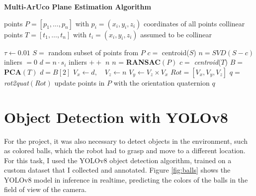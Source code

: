 \begin{algorithm}[H]
    \caption{\textbf{Multi-ArUco Plane Estimation Algorithm}}
    \label{alg:multi_aruco}
    \begin{algorithmic}[1]
    
    \Require points $P = \left[ p_1, \ldots, p_n \right]$ with $p_i = (x_i, y_i, z_i)$ coordinates of all points
    \Require collinear points $T = \left[t_1, \ldots, t_n \right]$ with $t_i = (x_i, y_i, z_i)$ assumed to be collinear
    
        \State $\tau \gets 0.01$ 
        \Repeat
            \State $S =$ random subset of points from $P$
            \State $c =$ centroid($S$) 
            \State $n = SVD(S - c)$  
            \State inliers $ = 0$ 
            \State $d = n \cdot s_i$ 
                 
                    \State inliers $++$
                \EndIf
            \EndFor
        \State \Return $n$ 
    \EndFunction
    \State
    \State $n$ = \textbf{RANSAC}$(P)$
    \State $c =$ \textit{centroid}($T$) 
    \State $B = $ \textbf{PCA}$(T)$ 
    \State $d = B[2]$ 
    \State $V_x \gets d, \quad V_z \gets n$
    \State $V_y \gets V_z \times V_x$ 
    \State $Rot = \left[V_x, V_y, V_z \right]$ 
    \State $q = $ \textit{rot2quat}$(Rot)$ 
    \State update points in $P$ with the orientation quaternion $q$
    \end{algorithmic}
\end{algorithm}

\section{Object Detection with YOLOv8}

For the project, it was also necessary to detect objects in the environment, such as colored balls, which the robot
had to grasp and move to a different location. For this task, I used the YOLOv8 object detection algorithm, trained
on a custom dataset that I collected and annotated. Figure \ref{fig:balls} shows the YOLOv8 model in inference
in realtime, predicting the colors of the balls in the field of view of the camera.

